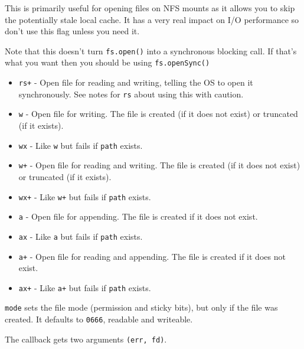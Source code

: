 This is primarily useful for opening files on NFS mounts as it allows
you to skip the potentially stale local cache. It has a very real impact
on I/O performance so don't use this flag unless you need it.

Note that this doesn't turn \texttt{fs.open()} into a synchronous
blocking call. If that's what you want then you should be using
\texttt{fs.openSync()}

\begin{itemize}
\item
  \texttt{\textquotesingle{}rs+\textquotesingle{}} - Open file for
  reading and writing, telling the OS to open it synchronously. See
  notes for \texttt{\textquotesingle{}rs\textquotesingle{}} about using
  this with caution.
\item
  \texttt{\textquotesingle{}w\textquotesingle{}} - Open file for
  writing. The file is created (if it does not exist) or truncated (if
  it exists).
\item
  \texttt{\textquotesingle{}wx\textquotesingle{}} - Like
  \texttt{\textquotesingle{}w\textquotesingle{}} but fails if
  \texttt{path} exists.
\item
  \texttt{\textquotesingle{}w+\textquotesingle{}} - Open file for
  reading and writing. The file is created (if it does not exist) or
  truncated (if it exists).
\item
  \texttt{\textquotesingle{}wx+\textquotesingle{}} - Like
  \texttt{\textquotesingle{}w+\textquotesingle{}} but fails if
  \texttt{path} exists.
\item
  \texttt{\textquotesingle{}a\textquotesingle{}} - Open file for
  appending. The file is created if it does not exist.
\item
  \texttt{\textquotesingle{}ax\textquotesingle{}} - Like
  \texttt{\textquotesingle{}a\textquotesingle{}} but fails if
  \texttt{path} exists.
\item
  \texttt{\textquotesingle{}a+\textquotesingle{}} - Open file for
  reading and appending. The file is created if it does not exist.
\item
  \texttt{\textquotesingle{}ax+\textquotesingle{}} - Like
  \texttt{\textquotesingle{}a+\textquotesingle{}} but fails if
  \texttt{path} exists.
\end{itemize}

\texttt{mode} sets the file mode (permission and sticky bits), but only
if the file was created. It defaults to \texttt{0666}, readable and
writeable.

The callback gets two arguments \texttt{(err,\ fd)}.

